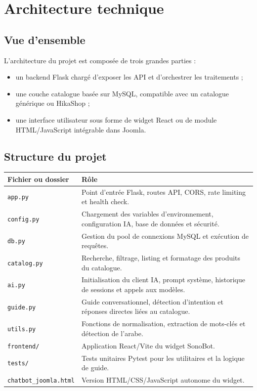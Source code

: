 \documentclass[12pt,a4paper]{report}
\begin{document}
\chapter{Architecture technique}

\section{Vue d'ensemble}

L'architecture du projet est composée de trois grandes parties :

\begin{itemize}
    \item un backend Flask chargé d'exposer les API et d'orchestrer les traitements ;
    \item une couche catalogue basée sur MySQL, compatible avec un catalogue générique ou HikaShop ;
    \item une interface utilisateur sous forme de widget React ou de module HTML/JavaScript intégrable dans Joomla.
\end{itemize}

\section{Structure du projet}

\begin{longtable}{p{5cm}p{9cm}}
\toprule
\textbf{Fichier ou dossier} & \textbf{Rôle} \\
\midrule
\texttt{app.py} & Point d'entrée Flask, routes API, CORS, rate limiting et health check. \\
\texttt{config.py} & Chargement des variables d'environnement, configuration IA, base de données et sécurité. \\
\texttt{db.py} & Gestion du pool de connexions MySQL et exécution de requêtes. \\
\texttt{catalog.py} & Recherche, filtrage, listing et formatage des produits du catalogue. \\
\texttt{ai.py} & Initialisation du client IA, prompt système, historique de sessions et appels aux modèles. \\
\texttt{guide.py} & Guide conversationnel, détection d'intention et réponses directes liées au catalogue. \\
\texttt{utils.py} & Fonctions de normalisation, extraction de mots-clés et détection de l'arabe. \\
\texttt{frontend/} & Application React/Vite du widget SonoBot. \\
\texttt{tests/} & Tests unitaires Pytest pour les utilitaires et la logique de guide. \\
\texttt{chatbot\_joomla.html} & Version HTML/CSS/JavaScript autonome du widget. \\
\bottomrule
\end{longtable}
\end{document}
